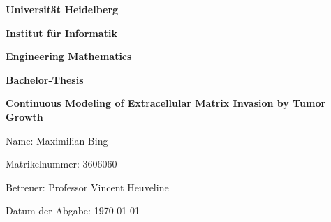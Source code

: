 \begin{titlepage}
    \begin{center}
	{\Huge\textbf{Universität Heidelberg}\par}
    {\Huge\textbf{Institut für Informatik} \par}
    {\Huge\textbf{Engineering Mathematics}\par}
	\vspace{3cm}
	{\Large\textbf{Bachelor-Thesis}\par}
	{\Huge\bfseries Continuous Modeling of Extracellular Matrix Invasion by Tumor Growth  \par}
    \end{center}
    \vspace{6cm}
	
    \raggedright
    {\Large Name: Maximilian Bing\par}
    {\Large Matrikelnummer: 3606060\par}
    {\Large Betreuer: Professor Vincent Heuveline\par}
    {\Large Datum der Abgabe: \today\par}
\end{titlepage}